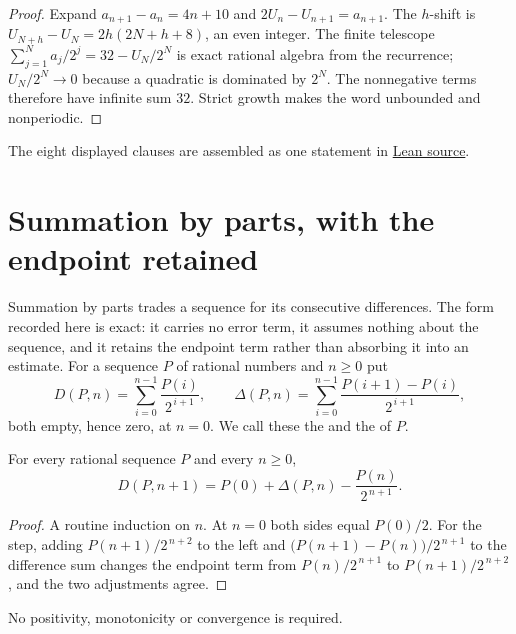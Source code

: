 \documentclass[11pt]{article}
\begin{document}
\begin{proof}
Expand $a_{n+1}-a_n=4n+10$ and $2U_n-U_{n+1}=a_{n+1}$.  The $h$-shift is
$U_{N+h}-U_N=2h(2N+h+8)$, an even integer.  The finite telescope
$\sum_{j=1}^{N}a_j/2^j=32-U_N/2^N$ is exact rational algebra from the
recurrence; $U_N/2^N\to0$ because a quadratic is dominated by $2^N$.  The
nonnegative terms therefore have infinite sum $32$.  Strict growth makes the
word unbounded and nonperiodic.
\end{proof}

\noindent The eight displayed clauses are assembled as one statement in
\href{https://github.com/wcook04/plectis-erdos/blob/f36a98bf3d3e6f65f1074e3b800e3293d5b8a51a/ErdosProblems/Erdos251/PaperCoreR7.lean#L27}{Lean source}.

\section{Summation by parts, with the endpoint retained}\label{sec:parts}

Summation by parts trades a sequence for its consecutive differences.  The form
recorded here is exact: it carries no error term, it assumes nothing about the
sequence, and it retains the endpoint term rather than absorbing it into an
estimate.  For a sequence $P$ of rational numbers and $n\ge0$ put
\[
 D(P,n)=\sum_{i=0}^{n-1}\frac{P(i)}{2^{\,i+1}},
 \qquad
 \Delta(P,n)=\sum_{i=0}^{n-1}\frac{P(i+1)-P(i)}{2^{\,i+1}} ,
\]
both empty, hence zero, at $n=0$.  We call these the
 and the
 of $P$.

\begin{proposition}\label{res:abel}
For every rational sequence $P$ and every $n\ge0$,
\[
 D(P,n+1)=P(0)+\Delta(P,n)-\frac{P(n)}{2^{\,n+1}} .
\]
\end{proposition}

\begin{proof}
A routine induction on $n$.  At $n=0$ both sides equal $P(0)/2$.  For the step, adding
$P(n+1)/2^{\,n+2}$ to the left and
$\bigl(P(n+1)-P(n)\bigr)/2^{\,n+1}$ to the difference sum changes the endpoint
term from $P(n)/2^{\,n+1}$ to $P(n+1)/2^{\,n+2}$, and the two adjustments agree.
\end{proof}

No positivity, monotonicity or convergence is required.
\end{document}
